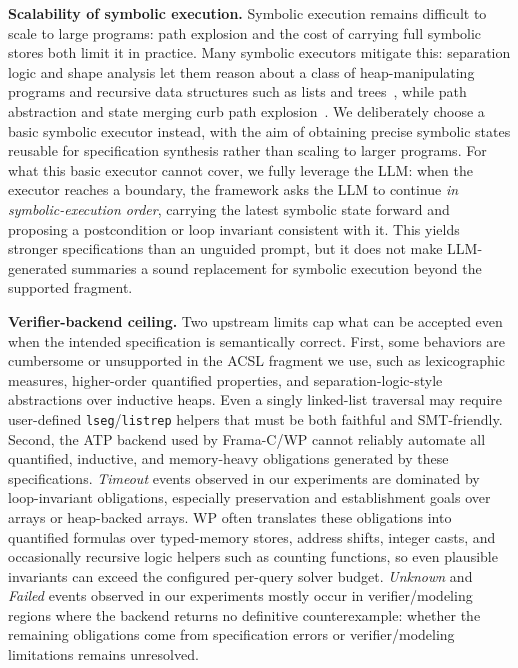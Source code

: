 \DIFaddbegin
\smallskip
\noindent\textbf{Scalability of symbolic execution.}
Symbolic execution remains difficult to scale to large programs: path explosion
and the cost of carrying full symbolic stores both limit it in practice. Many symbolic executors mitigate this: separation
logic and shape analysis let them reason about a class of heap-manipulating
programs and recursive data structures such as lists and
trees~\cite{calcagno2009compositional}, while path abstraction
and state merging curb path explosion~\cite{kuznetsov2012merging,avgerinos2014veritesting}.
We deliberately choose a basic symbolic executor instead, with the aim of
obtaining precise symbolic states reusable for specification synthesis rather
than scaling to larger programs. For what this basic executor cannot cover, we
fully leverage the LLM: when the executor reaches a boundary, the framework asks
the LLM to continue \emph{in symbolic-execution order}, carrying the latest
symbolic state forward and proposing a postcondition or loop invariant
consistent with it. This yields stronger specifications than an unguided prompt,
but it does not make LLM-generated summaries a sound replacement for symbolic
execution beyond the supported fragment.
\DIFaddend


\DIFaddbegin
\smallskip
\noindent\textbf{Verifier-backend ceiling.}
Two upstream limits cap what can be accepted even when the intended
specification is semantically correct. First, some behaviors are cumbersome or
unsupported in the ACSL fragment we use, such as lexicographic measures,
higher-order quantified properties, and separation-logic-style abstractions
over inductive heaps. Even a singly linked-list traversal may require
user-defined \texttt{lseg}/\texttt{listrep} helpers that must be both faithful
and SMT-friendly. Second, the ATP backend used by Frama-C/WP cannot reliably
automate all quantified, inductive, and memory-heavy obligations generated by
these specifications. 
\DIFaddend
\DIFaddbegin
\emph{Timeout} events observed in our experiments are dominated by loop-invariant obligations, especially
preservation and establishment goals over arrays or heap-backed arrays. 
WP often translates these obligations into
quantified formulas over typed-memory stores, address shifts, integer casts, and
occasionally recursive logic helpers such as counting functions, so even
plausible invariants can exceed the configured per-query solver budget.
\emph{Unknown} and \emph{Failed} events observed in our experiments mostly occur
in verifier/modeling regions where the backend returns no definitive
counterexample: whether the remaining obligations come from specification
errors or verifier/modeling limitations remains unresolved.
\DIFaddend

